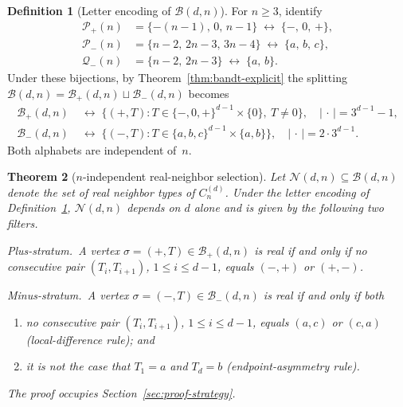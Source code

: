 \documentclass{amsart}
\newtheorem{theorem}{Theorem}[section]
\theoremstyle{definition}
\newtheorem{definition}[theorem]{Definition}
\theoremstyle{remark}
\begin{document}
\begin{definition}[Letter encoding of $\mathcal{B}(d, n)$]
\label{def:letters}
For $n \ge 3$, identify
\begin{align*}
  \mathcal{P}_+(n) &= \{-(n{-}1),\, 0,\, n{-}1\}
  \;\longleftrightarrow\; \{-,\, 0,\, +\}, \\
  \mathcal{P}_-(n) &= \{n{-}2,\, 2n{-}3,\, 3n{-}4\}
  \;\longleftrightarrow\; \{a,\, b,\, c\}, \\
  \mathcal{Q}_-(n) &= \{n{-}2,\, 2n{-}3\}
  \;\longleftrightarrow\; \{a,\, b\}.
\end{align*}
Under these bijections, by Theorem~\ref{thm:bandt-explicit}
the splitting $\mathcal{B}(d, n) = \mathcal{B}_+(d, n) \sqcup
\mathcal{B}_-(d, n)$ becomes
\begin{align*}
  \mathcal{B}_+(d, n) &\;\longleftrightarrow\;
    \bigl\{(+, T) : T \in \{-, 0, +\}^{d-1} \times \{0\},\
                    T \neq 0\bigr\},
    \quad |\,\cdot\,| = 3^{d-1} - 1, \\
  \mathcal{B}_-(d, n) &\;\longleftrightarrow\;
    \bigl\{(-, T) : T \in \{a, b, c\}^{d-1} \times \{a, b\}\bigr\},
    \quad |\,\cdot\,| = 2 \cdot 3^{d-1}.
\end{align*}
Both alphabets are independent of~$n$.
\end{definition}

\begin{theorem}[$n$-independent real-neighbor selection]
\label{thm:nindep-real}
Let $\mathcal{N}(d, n) \subseteq \mathcal{B}(d, n)$ denote the set
of real neighbor types of $C_n^{(d)}$.  Under the letter encoding
of Definition~\ref{def:letters},
$\mathcal{N}(d, n)$ depends on $d$ alone and is given by the
following two filters.

\emph{Plus-stratum.}\
A vertex $\sigma = (+, T) \in \mathcal{B}_+(d, n)$ is real if and
only if no consecutive pair $(T_i, T_{i+1})$, $1 \le i \le d-1$,
equals $(-, +)$ or $(+, -)$.

\emph{Minus-stratum.}\
A vertex $\sigma = (-, T) \in \mathcal{B}_-(d, n)$ is real if and
only if both
\begin{enumerate}
  \item[\textup{(M1)}] no consecutive pair $(T_i, T_{i+1})$,
    $1 \le i \le d-1$, equals $(a, c)$ or $(c, a)$
    \textup{(}local-difference rule\textup{)}; and
  \item[\textup{(M2)}] it is not the case that $T_1 = a$ and
    $T_d = b$ \textup{(}endpoint-asymmetry rule\textup{)}.
\end{enumerate}
The proof occupies Section~\ref{sec:proof-strategy}.
\end{theorem}
\end{document}
